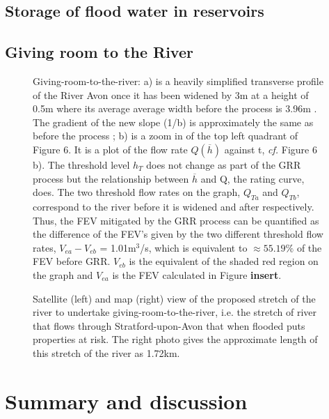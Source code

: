 \documentclass[11pt,a4paper]{article}
\begin{document}
\subsection{Storage of flood water in reservoirs}

\subsection{Giving room to the River}

\begin{figure}[H]
\begin{center}
\hfill
{}
\caption{Giving-room-to-the-river: a) is a heavily simplified transverse profile of the River Avon once it has been widened by 3m at a height of 0.5m where its average average width before the process is 3.96m \cite{canal}. The gradient of the new slope (1/b) is approximately the same as before the process {;} b) is a zoom in of the top left quadrant of Figure 6. It is a plot of the flow rate $Q(\overline{h})$ against t, \textit{cf.} Figure 6 b). The threshold level $h_T$ does not change as part of the GRR process but the relationship between $\overline{h}$ and Q, the rating curve, does. The two threshold flow rates on the graph, $Q_{Ta}$ and $Q_{Tb}$, correspond to the river before it is widened and after respectively. Thus, the FEV mitigated by the GRR process can be quantified as the difference of the FEV's given by the two different threshold flow rates, $V_{ea}-V_{eb}$ = 1.01m$^3$/s, which is equivalent to $\approx 55.19\%$ of the FEV before GRR. $V_{eb}$ is the equivalent of the shaded red region on the graph and $V_{ea}$ is the FEV calculated in Figure \textbf{insert}.}
\end{center}
\end{figure}

\begin{figure}[H]
\caption{Satellite (left) and map (right) view \cite{maps} of the proposed stretch of the river to undertake giving-room-to-the-river, i.e. the stretch of river that flows through Stratford-upon-Avon that when flooded puts properties at risk. The right photo gives the approximate length of this stretch of the river as 1.72km.}
\end{figure}


\newpage
\section{Summary and discussion}
\end{document}
